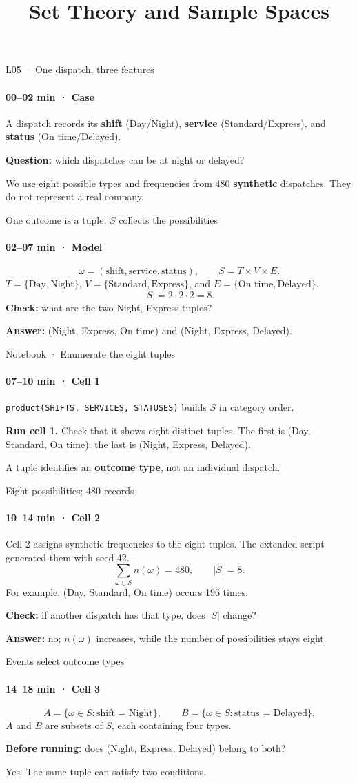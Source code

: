 \documentclass[aspectratio=169,11pt,english]{beamer}
\title[L05 · 40 minutes]{Set Theory and Sample Spaces}
\begin{document}
\begin{frame}{L05 · One dispatch, three features}
\framesubtitle{00–02 min · Case}
A dispatch records its \textbf{shift} (Day/Night), \textbf{service} (Standard/Express), and \textbf{status} (On time/Delayed).

\medskip
\textbf{Question:} which dispatches can be at night or delayed?

\medskip
We use eight possible types and frequencies from 480 \textbf{synthetic} dispatches. They do not represent a real company.
\end{frame}
\begin{frame}{One outcome is a tuple; $S$ collects the possibilities}
\framesubtitle{02–07 min · Model}
\[
\omega=(\text{shift},\text{service},\text{status}),\qquad S=T\times V\times E.
\]
$T=\{\text{Day},\text{Night}\}$, $V=\{\text{Standard},\text{Express}\}$, and $E=\{\text{On time},\text{Delayed}\}$.
\[
|S|=2\cdot2\cdot2=8.
\]
\textbf{Check:} what are the two Night, Express tuples?

\medskip
\textbf{Answer:} (Night, Express, On time) and (Night, Express, Delayed).
\end{frame}
\begin{frame}{Notebook · Enumerate the eight tuples}
\framesubtitle{07–10 min · Cell 1}
\texttt{product(SHIFTS, SERVICES, STATUSES)} builds $S$ in category order.

\medskip
\textbf{Run cell 1.} Check that it shows eight distinct tuples. The first is (Day, Standard, On time); the last is (Night, Express, Delayed).

\medskip
A tuple identifies an \textbf{outcome type}, not an individual dispatch.
\end{frame}
\begin{frame}{Eight possibilities; 480 records}
\framesubtitle{10–14 min · Cell 2}
Cell 2 assigns synthetic frequencies to the eight tuples. The extended script generated them with seed 42.
\[
\sum_{\omega\in S}n(\omega)=480,\qquad |S|=8.
\]
For example, (Day, Standard, On time) occurs 196 times.

\medskip
\textbf{Check:} if another dispatch has that type, does $|S|$ change?

\medskip
\textbf{Answer:} no; $n(\omega)$ increases, while the number of possibilities stays eight.
\end{frame}
\begin{frame}{Events select outcome types}
\framesubtitle{14–18 min · Cell 3}
\[
A=\{\omega\in S:\text{shift = Night}\},\qquad
B=\{\omega\in S:\text{status = Delayed}\}.
\]
$A$ and $B$ are subsets of $S$, each containing four types.

\medskip
\textbf{Before running:} does (Night, Express, Delayed) belong to both?

\medskip
Yes. The same tuple can satisfy two conditions.
\end{frame}
\end{document}
